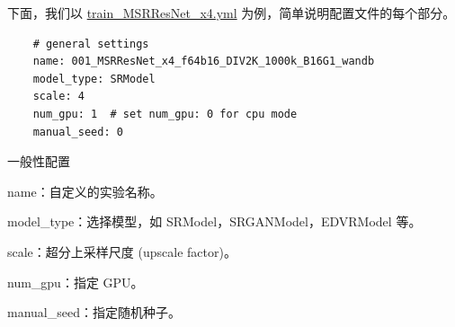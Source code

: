 \documentclass[../main.tex]{subfiles}
\begin{document}
	下面，我们以 \href{https://github.com/XPixelGroup/BasicSR/blob/master/options/train/SRResNet_SRGAN/train_MSRResNet_x4.yml}{train\_MSRResNet\_x4.yml} 为例，简单说明配置文件的每个部分。
	
	\begin{verbatim}
    # general settings
    name: 001_MSRResNet_x4_f64b16_DIV2K_1000k_B16G1_wandb
    model_type: SRModel
    scale: 4
    num_gpu: 1  # set num_gpu: 0 for cpu mode
    manual_seed: 0
	\end{verbatim}
	\begin{exampleBox}[righthand ratio=0.00, sidebyside, sidebyside align=center, lower separated=false]{一般性配置}
	
	name：自定义的实验名称。
	
    model\_type：选择模型，如 SRModel，SRGANModel，EDVRModel 等。
    
    scale：超分上采样尺度 (upscale factor)。
    
    num\_gpu：指定 GPU。
    
    manual\_seed：指定随机种子。
    \end{exampleBox}
    
\end{document}
